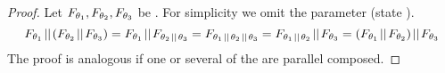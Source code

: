 \documentclass[preview]{standalone}
\begin{document}
\begin{proof}
	Let	$\grpfct[\viewppty_1], \grpfct[\viewppty_2], \grpfct[\viewppty_3]$ be \grpfctsN. For simplicity we omit the parameter (state \state).
	\[
		\grpfct[\viewppty_1] \pll (\grpfct[\viewppty_2] \pll \grpfct[\viewppty_3]) = \grpfct[\viewppty_1] \pll \grpfct[{\viewppty_2 \pll \viewppty_3}] = \grpfct[{\viewppty_1 \pll \viewppty_2 \pll \viewppty_3}] = \grpfct[{\viewppty_1 \pll \viewppty_2}] \pll \grpfct[\viewppty_3] = (\grpfct[\viewppty_1] \pll \grpfct[\viewppty_2]) \pll \grpfct[\viewppty_3]
	\]
	The proof is analogous if one or several of the \grpfctsN are parallel composed.
	
\end{proof}
\end{document}
